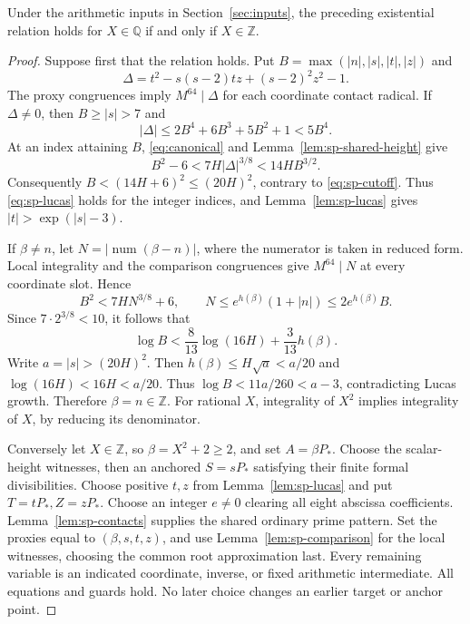 \begin{theorem}\label{thm:sp-definition}
Under the arithmetic inputs in Section~\ref{sec:inputs}, the preceding
existential relation holds for $X\in\mathbb Q$ if and only if
$X\in\mathbb Z$.
\end{theorem}
\begin{proof}
Suppose first that the relation holds. Put
$B=\max(|n|,|s|,|t|,|z|)$ and
\[
 \Delta=t^2-s(s-2)tz+(s-2)^2z^2-1.
\]
The proxy congruences imply $M^{64}\mid\Delta$ for each coordinate
contact radical. If $\Delta\ne0$, then $B\ge|s|>7$ and
\[
 |\Delta|\le2B^4+6B^3+5B^2+1<5B^4.
\]
At an index attaining $B$, \eqref{eq:canonical} and
Lemma~\ref{lem:sp-shared-height} give
\[
 B^2-6<7H|\Delta|^{3/8}<14HB^{3/2}.
\]
Consequently $B<(14H+6)^2\le(20H)^2$, contrary to
\eqref{eq:sp-cutoff}. Thus \eqref{eq:sp-lucas} holds for the
integer indices, and Lemma~\ref{lem:sp-lucas} gives
$|t|>\exp(|s|-3)$.

If $\beta\ne n$, let $N=|\operatorname{num}(\beta-n)|$,
where the numerator is taken in reduced form. Local integrality and
the comparison congruences give $M^{64}\mid N$ at every coordinate
slot. Hence
\[
 B^2<7HN^{3/8}+6,\qquad
 N\le e^{h(\beta)}(1+|n|)\le2e^{h(\beta)}B.
\]
Since $7\cdot2^{3/8}<10$, it follows that
\[
 \log B<\frac8{13}\log(16H)+\frac3{13}h(\beta).
\]
Write $a=|s|>(20H)^2$. Then
$h(\beta)\le H\sqrt a<a/20$ and
$\log(16H)<16H<a/20$. Thus
$\log B<11a/260<a-3$, contradicting Lucas growth.
Therefore $\beta=n\in\mathbb Z$. For rational $X$, integrality
of $X^2$ implies integrality of $X$, by reducing its denominator.

Conversely let $X\in\mathbb Z$, so $\beta=X^2+2\ge2$, and set
$A=\beta P_*$. Choose the scalar-height witnesses, then an anchored
$S=sP_*$ satisfying their finite formal divisibilities. Choose positive
$t,z$ from Lemma~\ref{lem:sp-lucas} and put $T=tP_*,Z=zP_*$.
Choose an integer $e\ne0$ clearing all eight abscissa coefficients.
Lemma~\ref{lem:sp-contacts} supplies the shared ordinary prime pattern.
Set the proxies equal to $(\beta,s,t,z)$, and use
Lemma~\ref{lem:sp-comparison} for the local witnesses, choosing the
common root approximation last. Every remaining variable is an indicated
coordinate, inverse, or fixed arithmetic intermediate. All equations and
guards hold. No later choice changes an earlier target or anchor point.
\end{proof}
